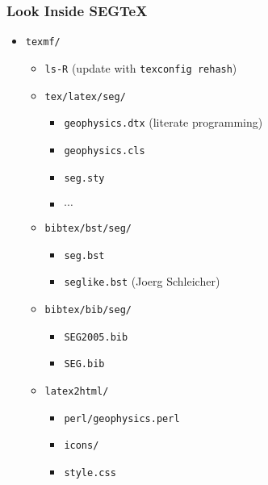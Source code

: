 \begin{frame}
  \frametitle{Look Inside SEGTeX}
  \begin{itemize}
  \item \texttt{texmf/}
    \begin{itemize}
    \item \texttt{ls-R} (update with \texttt{texconfig rehash}) 
    \item \texttt{tex/latex/seg/}

    \begin{itemize}
    \item \texttt{geophysics.dtx} (literate programming)
    \item \texttt{geophysics.cls}
    \item \texttt{seg.sty}
    \item $\cdots$
    \end{itemize}

    \item \texttt{bibtex/bst/seg/}

     \begin{itemize}
    \item \texttt{seg.bst}
    \item \texttt{seglike.bst} (Joerg Schleicher)
    \end{itemize}

    \item \texttt{bibtex/bib/seg/}

    \begin{itemize}
    \item \texttt{SEG2005.bib}
    \item \texttt{SEG.bib}
    \end{itemize}

    \item {\texttt{latex2html/}}
    
    \begin{itemize}
    \item \texttt{perl/geophysics.perl}
    \item \texttt{icons/}
    \item \texttt{style.css}
    \end{itemize}

    \end{itemize}    
  \end{itemize}
\end{frame}


%
%
%

